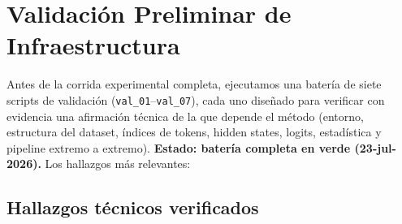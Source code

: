\documentclass[12pt,a4paper]{article}
\begin{document}
\section{Validación Preliminar de Infraestructura}
\label{sec:validacion}

Antes de la corrida experimental completa, ejecutamos una batería de siete scripts de validación (\texttt{val\_01}--\texttt{val\_07}), cada uno diseñado para verificar con evidencia una afirmación técnica de la que depende el método (entorno, estructura del dataset, índices de tokens, hidden states, logits, estadística y pipeline extremo a extremo).
\textbf{Estado: batería completa en verde (23-jul-2026).}
Los hallazgos más relevantes:

\subsection{Hallazgos técnicos verificados}
\end{document}
